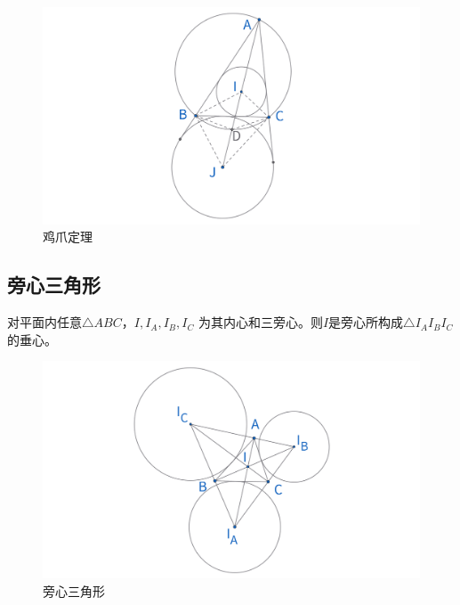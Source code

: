 \begin{figure}[H]
    \centering
    \includegraphics[width=\linewidth]{figures/三角形五心/鸡爪定理2.png}
    \caption{鸡爪定理}
\end{figure}



\newpage 
\subsection{旁心三角形}
\begin{proposition}[旁心三角形]
    对平面内任意$\triangle ABC$，$I, I_A,I_B,I_C$ 为其内心和三旁心。则$I$是旁心所构成$\triangle I_AI_BI_C$ 的垂心。
\end{proposition}

\begin{figure}[H]
    \centering
    \includegraphics[width=\linewidth]{figures/三角形五心/旁心三角形.png}
    \caption{旁心三角形}
\end{figure}




